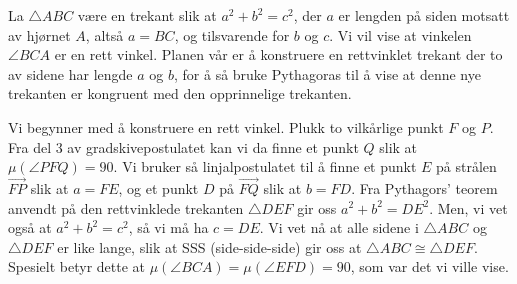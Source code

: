 \begin{oppgave}[5.4.3]
    La $\triangle ABC$ være en trekant slik at $a^2+b^2=c^2$, der $a$ er lengden på siden motsatt av hjørnet $A$, altså $a=BC$, og tilsvarende for $b$ og $c$. 
    Vi vil vise at vinkelen $\angle BCA$ er en rett vinkel. 
    Planen vår er å konstruere en rettvinklet trekant der to av sidene har lengde $a$ og $b$, for å så bruke Pythagoras til å vise at denne nye trekanten er kongruent med den opprinnelige trekanten. 

    Vi begynner med å konstruere en rett vinkel. 
    Plukk to vilkårlige punkt $F$ og $P$. 
    Fra del 3 av gradskivepostulatet kan vi da finne et punkt $Q$ slik at $\mu(\angle PFQ)=90$. 
    Vi bruker så linjalpostulatet til å finne et punkt $E$ på strålen $\overrightarrow{FP}$ slik at $a=FE$, og et punkt $D$ på $\overrightarrow{FQ}$ slik at $b=FD$. 
    Fra Pythagors' teorem anvendt på den rettvinklede trekanten $\triangle DEF$ gir oss $a^2+b^2=DE^2$. 
    Men, vi vet også at $a^2+b^2=c^2$, så vi må ha $c=DE$. 
    Vi vet nå at alle sidene i $\triangle ABC$ og $\triangle DEF$ er like lange, slik at SSS (side-side-side) gir oss at $\triangle ABC\cong \triangle DEF$. 
    Spesielt betyr dette at $\mu(\angle BCA)=\mu(\angle EFD)=90$, som var det vi ville vise. 

    \begin{figure}
        
    \end{figure}
\end{oppgave}